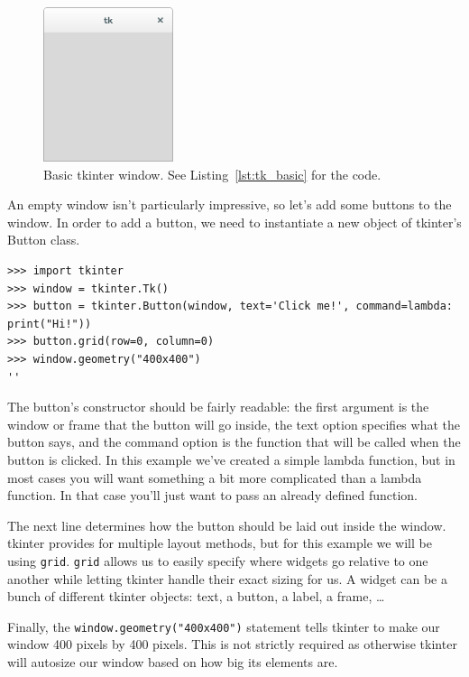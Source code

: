\documentclass[11pt]{cselabheader}
\begin{document}
\begin{figure}[h]
  \centering
  \includegraphics[width=1.5in]{img/tk_basic.png}
  \caption{Basic tkinter window. See Listing~\ref{lst:tk_basic} for the code.}
  \label{fig:tk_basic}
\end{figure}

An empty window isn't particularly impressive, so let's add some buttons
to the window. In order to add a button, we need to instantiate a new object
of tkinter's Button class.

\begin{lstlisting}[style=ipython]
>>> import tkinter
>>> window = tkinter.Tk()
>>> button = tkinter.Button(window, text='Click me!', command=lambda: print("Hi!"))
>>> button.grid(row=0, column=0)
>>> window.geometry("400x400")
''
\end{lstlisting}

The button's constructor should be fairly readable: the first argument is
the window or frame that the button will go inside, the text option specifies what
the button says, and the command option is the function that will be called
when the button is clicked.  In this example we've created a simple lambda
function, but in most cases you will want something a bit more complicated than
a lambda function. In that case you'll just want to pass an already defined
function. 

The next line determines how the button should be laid out inside the window.
tkinter provides for multiple layout methods, but for this example we will
be using \texttt{grid}. \texttt{grid} allows us to easily specify where widgets
go relative to one another while letting tkinter handle their exact sizing for
us. A widget can be a bunch of different tkinter objects: text, a button, a
label, a frame, \ldots

Finally, the \lstinline{window.geometry("400x400")} statement tells tkinter to
make our window 400 pixels by 400 pixels. This is not strictly required as
otherwise tkinter will autosize our window based on how big its elements are.
\end{document}

